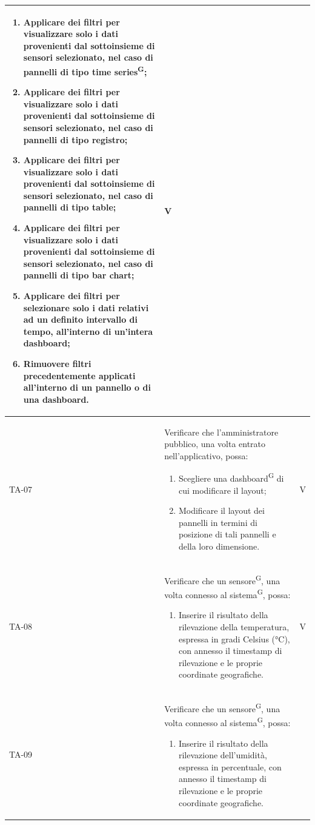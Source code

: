 \documentclass[8pt]{article}
\newcommand{\glossterm}[1]{#1\textsuperscript{G}} %
\begin{document}
\begin{longtable}{|>{\centering}p{2cm}|>{\RaggedRight}m{12cm}|>{\centering\arraybackslash}p{2cm}|}
\begin{enumerate}
        \item Applicare dei filtri per visualizzare solo i dati provenienti dal sottoinsieme di sensori selezionato, nel caso di pannelli di tipo \glossterm{time series}; 
        \item Applicare dei filtri per visualizzare solo i dati provenienti dal sottoinsieme di sensori selezionato, nel caso di pannelli di tipo registro;
        \item Applicare dei filtri per visualizzare solo i dati provenienti dal sottoinsieme di sensori selezionato, nel caso di pannelli di tipo table;
        \item Applicare dei filtri per visualizzare solo i dati provenienti dal sottoinsieme di sensori selezionato, nel caso di pannelli di tipo bar chart;  
        \item Applicare dei filtri per selezionare solo i dati relativi ad un definito intervallo di tempo, all’interno di un’intera dashboard;
        \item Rimuovere filtri precedentemente applicati all'interno di un pannello o di una dashboard.
    \end{enumerate}
    & V \\
    \hline
    TA-07 & Verificare che l'amministratore pubblico, una volta entrato
    nell’applicativo, possa:
    \begin{enumerate}
        \item Scegliere una \glossterm{dashboard} di cui modificare il layout;
        \item Modificare il layout dei pannelli in termini di posizione di tali pannelli e della loro dimensione.
    \end{enumerate}
    & V \\
    \hline
    TA-08 &
    Verificare che un \glossterm{sensore}, una volta connesso al \glossterm{sistema}, possa:
    \begin{enumerate}
        \item Inserire il risultato della rilevazione della temperatura, espressa in gradi Celsius
            (°C), con annesso il timestamp di rilevazione e le proprie coordinate geografiche.        
    \end{enumerate}
    & V \\
    \hline
    TA-09 &
    Verificare che un \glossterm{sensore}, una volta connesso al \glossterm{sistema}, possa:
    \begin{enumerate}
    \item Inserire il risultato della rilevazione dell’umidità, espressa in percentuale, con annesso il timestamp di rilevazione e le proprie coordinate geografiche.

\end{enumerate}
\end{longtable}
\end{document}
